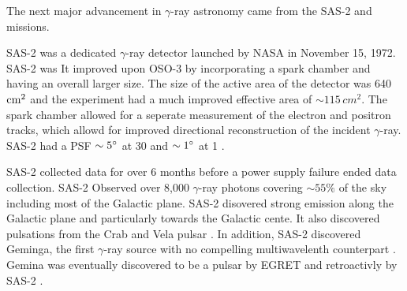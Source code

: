 The next major advancement in $\gamma$-ray astronomy came from
the \ac{SAS-2} and \cosb missions.

\ac{SAS-2} was a dedicated $\gamma$-ray detector
launched by \ac{NASA} in November 15, 1972.  \ac{SAS-2} was
\cite{fichtel_1975_high-energy-gamma-ray} It improved upon \ac{OSO-3}
by incorporating a spark chamber and having an overall larger size.
The size of the active area of the detector was 640 $\text{cm}^2$ and the
experiment had a much improved effective area of $\sim 115\,cm^2$. The
spark chamber allowed for a seperate measurement of the electron and
positron tracks, which allowd for improved directional reconstruction
of the incident $\gamma$-ray. \ac{SAS-2} had a PSF $\sim5^\circ$ at 30
\mev and $\sim1^\circ$ at 1 \gev.

\ac{SAS-2} collected data for over 6 months before a power supply
failure ended data collection. \ac{SAS-2} Observed over 8,000
$\gamma$-ray photons covering $\sim55\%$ of
the sky including most of the Galactic plane.  
\ac{SAS-2} disovered strong emission
along the Galactic plane and particularly towards the Galactic
cente. It also discovered
pulsations from the
Crab \citep{fichtel_1975_high-energy-gamma-ray} and Vela pulsar
\citep{thompson_1977_sas-2-high-energy}.  In addition, \ac{SAS-2}
discovered Geminga, the first $\gamma$-ray source with no compelling
multiwavelenth counterpart \citep{thompson_1977_final-sas-2}. Gemina
was eventually discovered to be a pulsar by \ac{EGRET}
\citep{bertsch_1992_pulsed-high-energy} and retroactivly by \ac{SAS-2}
\citep{mattox_1992_observation-pulsed}.



